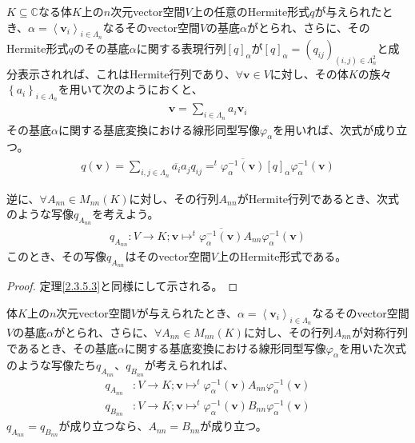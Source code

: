 \documentclass[dvipdfmx]{jsarticle}
\begin{document}
\begin{thm}\label{2.3.5.4}
$K \subseteq \mathbb{C}$なる体$K$上の$n$次元vector空間$V$上の任意のHermite形式$q$が与えられたとき、$\alpha = \left\langle \mathbf{v}_{i} \right\rangle_{i \in \varLambda_{n}}$なるそのvector空間$V$の基底$\alpha$がとられ、さらに、そのHermite形式$q$のその基底$\alpha$に関する表現行列$[ q]_{\alpha}$が$[ q]_{\alpha} = \left( q_{ij} \right)_{(i,j) \in \varLambda_{n}^{2}}$と成分表示されれば、これはHermite行列であり、$\forall\mathbf{v} \in V$に対し、その体$K$の族々$\left\{ a_{i} \right\}_{i \in \varLambda_{n}}$を用いて次のようにおくと、
\begin{align*}
\mathbf{v} = \sum_{i \in \varLambda_{n}} {a_{i}\mathbf{v}_{i}}
\end{align*}
その基底$\alpha$に関する基底変換における線形同型写像$\varphi_{\alpha}$を用いれば、次式が成り立つ。
\begin{align*}
q\left( \mathbf{v} \right) = \sum_{i,j \in \varLambda_{n}} {\overline{a_{i}}a_{j}q_{ij}} =^{t}\overline{\varphi_{\alpha}^{- 1}\left( \mathbf{v} \right)}[ q]_{\alpha}\varphi_{\alpha}^{- 1}\left( \mathbf{v} \right)
\end{align*}\par
逆に、$\forall A_{nn} \in M_{nn}(K)$に対し、その行列$A_{nn}$がHermite行列であるとき、次式のような写像$q_{A_{nn}}$を考えよう。
\begin{align*}
q_{A_{nn}}:V \rightarrow K;\mathbf{v} \mapsto^{t}\overline{\varphi_{\alpha}^{- 1}\left( \mathbf{v} \right)}A_{nn}\varphi_{\alpha}^{- 1}\left( \mathbf{v} \right)
\end{align*}
このとき、その写像$q_{A_{nn}}$はそのvector空間$V$上のHermite形式である。
\end{thm}
\begin{proof} 定理\ref{2.3.5.3}と同様にして示される。
\end{proof}
\begin{thm}\label{2.3.5.5}
体$K$上の$n$次元vector空間$V$が与えられたとき、$\alpha = \left\langle \mathbf{v}_{i} \right\rangle_{i \in \varLambda_{n}}$なるそのvector空間$V$の基底$\alpha$がとられ、さらに、$\forall A_{nn} \in M_{nn}(K)$に対し、その行列$A_{nn}$が対称行列であるとき、その基底$\alpha$に関する基底変換における線形同型写像$\varphi_{\alpha}$を用いた次式のような写像たち$q_{A_{nn}}$、$q_{B_{nn}}$が考えられれば、
\begin{align*}
q_{A_{nn}}&:V \rightarrow K;\mathbf{v} \mapsto^{t}\varphi_{\alpha}^{- 1}\left( \mathbf{v} \right)A_{nn}\varphi_{\alpha}^{- 1}\left( \mathbf{v} \right)\\
q_{B_{nn}}&:V \rightarrow K;\mathbf{v} \mapsto^{t}\varphi_{\alpha}^{- 1}\left( \mathbf{v} \right)B_{nn}\varphi_{\alpha}^{- 1}\left( \mathbf{v} \right)
\end{align*}
$q_{A_{nn}} = q_{B_{nn}}$が成り立つなら、$A_{nn} = B_{nn}$が成り立つ。
\end{thm}
\end{document}
